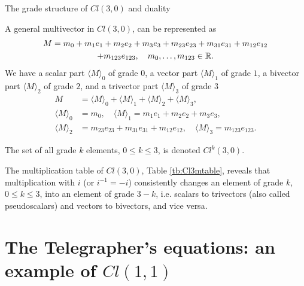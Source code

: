 \documentclass[10pt]{beamer}
\begin{document}
\begin{frame}[fragile]{The grade structure of $Cl(3,0)$ and duality}


A general multivector in $Cl(3,0)$, can be represented as
\begin{gather}
  M = m_0 + m_1 e_1 + m_2 e_2 + m_3 e_3 + m_{23} e_{23}
  + m_{31} e_{31}+ m_{12} e_{12}   \nonumber \\
  + m_{123} e_{123}, \quad
  m_0, \ldots , m_{123} \in \mathbb{R}. 
\end{gather}
\pause
We have 
a scalar part $\langle M \rangle_0$ of grade $0$, 
a vector part $\langle M \rangle_1$ of grade $1$, 
a bivector part $\langle M \rangle_2$ of grade $2$,
and a trivector part $\langle M \rangle_3$ of grade $3$
\begin{align}
  M &= \langle M \rangle_0 + \langle M \rangle_1 + \langle M \rangle_2 + \langle M \rangle_3,
  \\
   \langle M \rangle_0 &= m_0, \quad
  \langle M \rangle_1 = m_1 e_1 + m_2 e_2 + m_3 e_3, \nonumber \\
  \langle M \rangle_2 &= m_{23} e_{23} + m_{31} e_{31}+ m_{12} e_{12},   
  \quad
  \langle M \rangle_3 = m_{123} e_{123}.
  \nonumber 
\end{align}


\end{frame}

\begin{frame}[fragile]{}
The set of all grade $k$ elements, $0 \leq k \leq 3$, is denoted $Cl^k(3,0)$.

The multiplication table of $Cl(3,0)$, Table \ref{tb:Cl3mtable}, reveals that multiplication with $i$ (or $i^{-1}=-i$) consistently changes an element of grade $k$, $0 \leq k \leq 3$, into an element of grade $3-k$, i.e. scalars to trivectors (also called pseudoscalars) and vectors to bivectors, and vice versa. 



\end{frame}


\section{The Telegrapher's equations: an example of $Cl(1,1)$}
\end{document}
